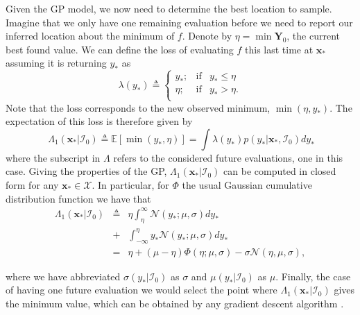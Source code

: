 \documentclass[twoside]{article}
\newcommand{\I}{\mathcal{I}}
\newcommand{\E}{\mathbb{E}}
\newcommand{\bx}{\textbf{x}}
\newcommand{\bY}{\textbf{Y}}
\begin{document}
Given the GP model, we now need to determine the best location to sample. Imagine that we only have one remaining evaluation before we need to report our inferred location about the minimum of $f$. Denote by $\eta = \min \bY_0$, the current best found value. We can define the loss of evaluating $f$ this last time at $\bx_*$ assuming it is returning $y_*$ as
$$\lambda(y_*)\triangleq \left\{ \begin{array}{lcl}
y_*;             & \mbox{if}  &  y_* \leq \eta \\
 \eta; & \mbox{if}  & y_* > \eta. \\
\end{array}
\right.$$
Note that the loss corresponds to the new observed minimum, $\min (\eta,y_*)$. The expectation of this loss is therefore given by
$$\ \Lambda_1(\bx_*| \I_0) \triangleq \E[ \min (y_*,\eta)]= \int \lambda(y_*)p(y_* |\bx_*,\I_0)dy_*$$
where the subscript in $\Lambda$ refers to the considered future evaluations, one in this case.  Giving the properties of the GP, $\Lambda_1(\bx_*| \I_0)$ can be computed in closed form for any $\bx_* \in \mathcal{X}$. In particular, for $\Phi$ the usual Gaussian cumulative distribution function we have that
\begin{eqnarray}\label{eq:expected_loss}
\Lambda_1(\bx_*| \I_0) &  \triangleq & \eta \int_{\eta}^{\infty} \mathcal{N}(y_*;\mu,\sigma) dy_* \\ \nonumber
& +  & \int_{-\infty}^{\eta} y_* \mathcal{N}(y_*;\mu,\sigma) dy_*  \\ \nonumber
& = &  \eta +(\mu  - \eta) \Phi (\eta ; \mu, \sigma) - \sigma \mathcal{N} (\eta, \mu, \sigma), \nonumber
\end{eqnarray}

where we have abbreviated $\sigma(y_*|\I_0)$ as $\sigma$ and $\mu(y_{*}|\I_0)$ as $\mu$. Finally, the case of having one future evaluation we would select the point where $\Lambda_1(\bx_*| \I_0) $ gives the minimum value, which can  be obtained by any gradient descent algorithm \cite{osborne_bayesian_2010}. 

\cite{Lizotte_2008}
\cite{Jones_2001}
\cite{Snoek*Larochelle*Adams_2012}
\cite{Brochu*Cora*DeFreitas_2010}


\end{document}
